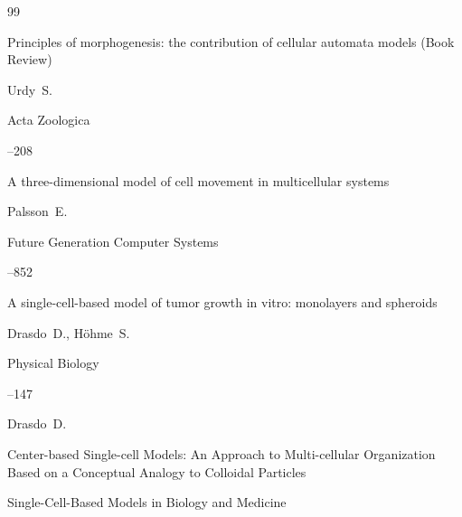  \begin{thebibliography}{99}




\paper Principles of morphogenesis: the contribution of cellular automata models (Book Review)

\by Urdy~S.

\jour Acta Zoologica




--208





\paper  A three-dimensional model of cell movement in multicellular systems

\by Palsson~E.

\jour Future Generation Computer Systems




--852




 


\paper A single-cell-based model of tumor growth in vitro: monolayers and spheroids

\by Drasdo~D., H\"ohme~S.

\jour Physical Biology




--147 


 

 


\by Drasdo~D.

\paper Center-based Single-cell Models: An Approach to Multi-cellular Organization Based on a Conceptual Analogy to Colloidal Particles	

\inbook Single-Cell-Based Models in Bio\-logy and Medicine


\end{thebibliography}
